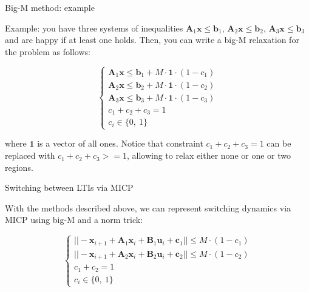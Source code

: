 \documentclass{beamer}
\begin{document}
\begin{frame}{Big-M method: example}
\begin{flushleft}

Example: you have three systems of inequalities $\mathbf{A}_1 \mathbf{x} \leq \mathbf{b}_1$, $\mathbf{A}_2 \mathbf{x} \leq \mathbf{b}_2$, $\mathbf{A}_3 \mathbf{x} \leq \mathbf{b}_3$ and are happy if at least one holds. Then, you can write a big-M relaxation for the problem as follows:

\begin{equation}
    \begin{cases}
    \mathbf{A}_1 \mathbf{x} \leq \mathbf{b}_1 + M \cdot \mathbf{1} \cdot (1 - c_1) \\
    \mathbf{A}_2 \mathbf{x} \leq \mathbf{b}_2 + M \cdot \mathbf{1} \cdot (1 - c_2) \\
    \mathbf{A}_3 \mathbf{x} \leq \mathbf{b}_3 + M \cdot \mathbf{1} \cdot (1 - c_3) \\
    c_1 + c_2 + c_3 = 1 \\
    c_i  \in \{0, \ 1 \}
    \end{cases}
\end{equation}

where $\mathbf{1}$ is a vector of all ones. Notice that constraint $c_1 + c_2 + c_3 = 1$ can be replaced with $c_1 + c_2 + c_3 >= 1$, allowing to relax either none  or one or two regions.

\end{flushleft}
\end{frame}





\begin{frame}{Switching between LTIs via MICP}
\begin{flushleft}

With the methods described above, we can represent switching dynamics via MICP using big-M and a norm trick:


\begin{equation}
    \begin{cases}
    || -\mathbf{x}_{i+1} + \mathbf{A}_1 \mathbf{x}_i + \mathbf{B}_1 \mathbf{u}_i + \mathbf{c}_1 || \leq 
    M \cdot (1 - c_1) \\
    || -\mathbf{x}_{i+1} + \mathbf{A}_2 \mathbf{x}_i + \mathbf{B}_2 \mathbf{u}_i + \mathbf{c}_2 || \leq 
    M \cdot (1 - c_2) \\
    c_1 + c_2 = 1 \\
    c_i  \in \{0, \ 1 \}
    \end{cases}
\end{equation}


\end{flushleft}
\end{frame}
\end{document}
